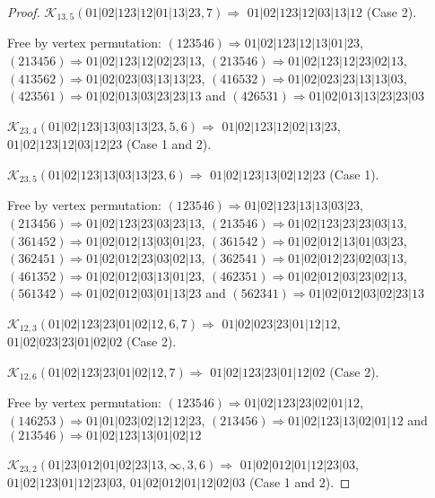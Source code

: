 \documentclass[12pt]{article}
\theoremstyle{plain}
\theoremstyle{definition}
\theoremstyle{remark}
\newcommand{\fancy}[1]{\mathcal{#1}}
\def\K{\fancy{K}}
\begin{document}
\begin{proof}
	$\K_{13,5}(01|02|123|12|01|13|23,7)\Rightarrow $ $01|02|123|12|03|13|12$ (Case 2).
	
	
	
	Free by vertex permutation: $(1 2 3 5 4 6)\Rightarrow 01|02|123|12|13|01|23$, $(2 1 3 4 5 6)\Rightarrow 01|02|123|12|02|23|13$, $(2 1 3 5 4 6)\Rightarrow 01|02|123|12|23|02|13$, $(4 1 3 5 6 2)\Rightarrow 01|02|023|03|13|13|23$, $(4 1 6 5 3 2)\Rightarrow 01|02|023|23|13|13|03$, $(4 2 3 5 6 1)\Rightarrow 01|02|013|03|23|23|13$ and $(4 2 6 5 3 1)\Rightarrow 01|02|013|13|23|23|03$
	
	
	
	\bigskip
	
	$\K_{23,4}(01|02|123|13|03|13|23,5, 6)\Rightarrow $ $01|02|123|12|02|13|23$, $01|02|123|12|03|12|23$ (Case 1 and 2).
	
	$\K_{23,5}(01|02|123|13|03|13|23,6)\Rightarrow $ $01|02|123|13|02|12|23$ (Case 1).
	
	
	
	Free by vertex permutation: $(1 2 3 5 4 6)\Rightarrow 01|02|123|13|13|03|23$, $(2 1 3 4 5 6)\Rightarrow 01|02|123|23|03|23|13$, $(2 1 3 5 4 6)\Rightarrow 01|02|123|23|23|03|13$, $(3 6 1 4 5 2)\Rightarrow 01|02|012|13|03|01|23$, $(3 6 1 5 4 2)\Rightarrow 01|02|012|13|01|03|23$, $(3 6 2 4 5 1)\Rightarrow 01|02|012|23|03|02|13$, $(3 6 2 5 4 1)\Rightarrow 01|02|012|23|02|03|13$, $(4 6 1 3 5 2)\Rightarrow 01|02|012|03|13|01|23$, $(4 6 2 3 5 1)\Rightarrow 01|02|012|03|23|02|13$, $(5 6 1 3 4 2)\Rightarrow 01|02|012|03|01|13|23$ and $(5 6 2 3 4 1)\Rightarrow 01|02|012|03|02|23|13$
	
	
	
	\bigskip
	
	$\K_{12,3}(01|02|123|23|01|02|12,6, 7)\Rightarrow $ $01|02|023|23|01|12|12$, $01|02|023|23|01|02|02$ (Case 2).
	
	$\K_{12,6}(01|02|123|23|01|02|12,7)\Rightarrow $ $01|02|123|23|01|12|02$ (Case 2).
	
	
	
	Free by vertex permutation: $(1 2 3 5 4 6)\Rightarrow 01|02|123|23|02|01|12$, $(1 4 6 2 5 3)\Rightarrow 01|01|023|02|12|12|23$, $(2 1 3 4 5 6)\Rightarrow 01|02|123|13|02|01|12$ and $(2 1 3 5 4 6)\Rightarrow 01|02|123|13|01|02|12$
	
	
	
	\bigskip
	
	$\K_{23,2}(01|23|012|01|02|23|13,\infty,3, 6)\Rightarrow $ $01|02|012|01|12|23|03$, $01|02|123|01|12|23|03$, $01|02|012|01|12|02|03$ (Case 1 and 2).
	

\end{proof}
\end{document}
